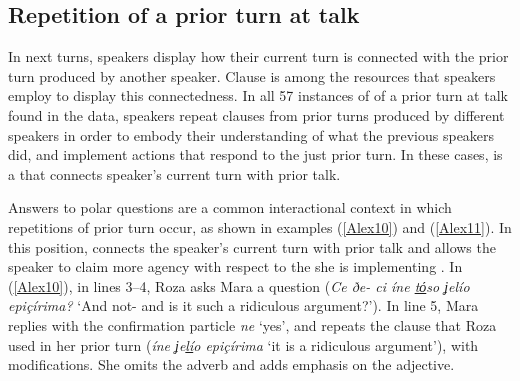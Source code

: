 \documentclass[output=paper]{LSP/langsci}
\begin{document}
\subsection{Repetition of a prior turn at talk}
\label{Alrepetition.turn}
In next turns, speakers display how their current turn is connected with the prior turn produced by another speaker. Clause  is among the resources that speakers employ to display this connectedness. In all 57 instances of  of a prior turn at talk found in the data, speakers repeat clauses from prior turns produced by different speakers in order to embody their understanding of what the previous speakers did, and implement actions that respond to the just prior turn. In these cases,  is a  that connects speaker’s current turn with prior talk. 

Answers to polar questions are a common interactional context in which repetitions of prior turn occur, as shown in examples (\ref{Alex10}) and (\ref{Alex11}). In this  position,  connects the speaker’s current turn with prior talk and allows the speaker to claim more agency with respect to the  she is implementing \citep[cf.][]{heritage2012}. In (\ref{Alex10}), in lines 3--4, Roza asks Mara a question (\textit{Ce ðe- ci íne \underline{tό}so ʝelío epiçírima?} `And not- and is it such a ridiculous argument?'). In line 5, Mara replies with the confirmation particle \textit{ne} `yes', and repeats the clause that Roza used in her prior turn (\textit{íne ʝe\underline{lí}o epiçírima} `it is a ridiculous argument'), with modifications. She omits the adverb and adds emphasis on the adjective. 
\end{document}
